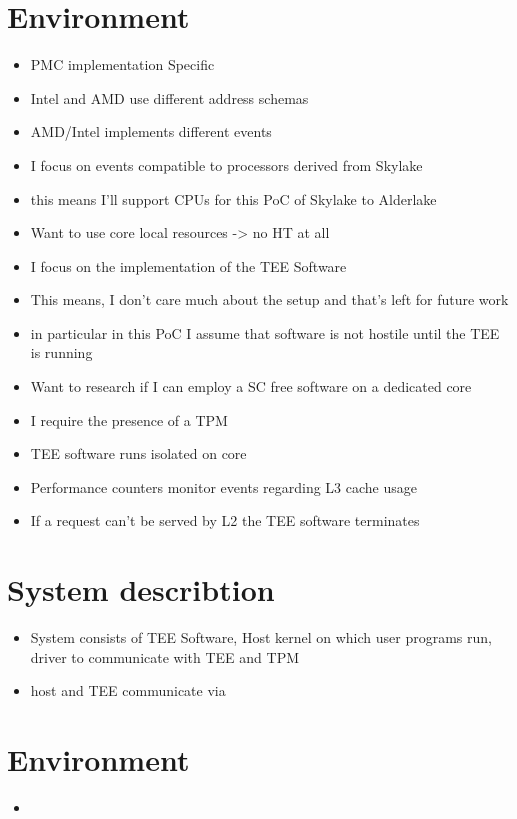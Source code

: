 \section{Environment}
\begin{itemize}
    \item PMC implementation Specific
    \item Intel and AMD use different address schemas
    \item AMD/Intel implements different events
    \item I focus on events compatible to processors derived from Skylake
    \item this means I'll support CPUs for this PoC of Skylake to Alderlake
    \item Want to use core local resources -> no HT at all
    \item I focus on the implementation of the TEE Software
    \item This means, I don't care much about the setup and that's left for
          future work
    \item in particular in this PoC I assume that software is not hostile until
          the TEE is running
    \item Want to research if I can employ a SC free software on a dedicated core
    \item I require the presence of a TPM
    \item TEE software runs isolated on core
    \item Performance counters monitor events regarding L3 cache usage
    \item If a request can't be served by L2 the TEE software terminates
\end{itemize}

\section{System describtion}
\begin{itemize}
    \item System consists of TEE Software, Host kernel on which user programs run,
          driver to communicate with TEE and TPM
    \item host and TEE communicate via
\end{itemize}

\section{Environment}
\begin{itemize}
    \item
\end{itemize}


\cleardoublepage

